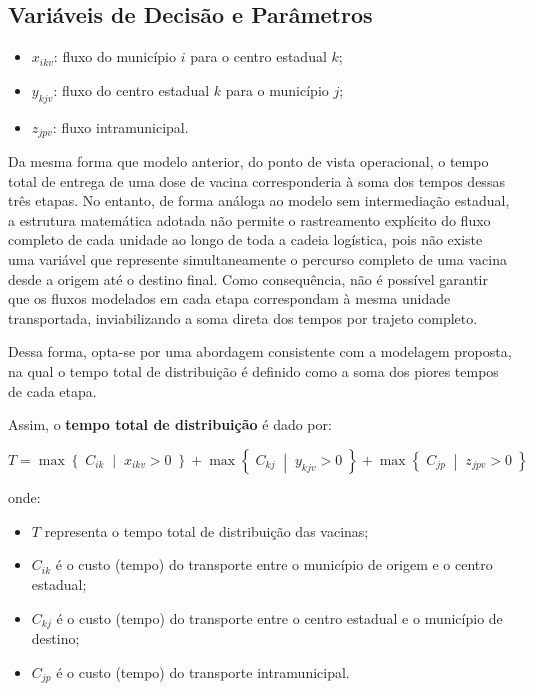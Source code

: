 \subsection{Variáveis de Decisão e Parâmetros}

\begin{itemize}
    \item $x_{ikv}$: fluxo do município $i$ para o centro estadual $k$;
    \item $y_{kjv}$: fluxo do centro estadual $k$ para o município $j$;
    \item $z_{jpv}$: fluxo intramunicipal.
\end{itemize}

Da mesma forma que modelo anterior, do ponto de vista operacional, o tempo total de entrega de uma dose de vacina corresponderia à soma dos tempos dessas três etapas. No entanto, de forma análoga ao modelo sem intermediação estadual, a estrutura matemática adotada não permite o rastreamento explícito do fluxo completo de cada unidade ao longo de toda a cadeia logística, pois não existe uma variável que represente simultaneamente o percurso completo de uma vacina desde a origem até o destino final. Como consequência, não é possível garantir que os fluxos modelados em cada etapa correspondam à mesma unidade transportada, inviabilizando a soma direta dos tempos por trajeto completo.

Dessa forma, opta-se por uma abordagem consistente com a modelagem proposta, na qual o tempo total de distribuição é definido como a soma dos piores tempos de cada etapa.

Assim, o \textbf{tempo total de distribuição} é dado por:

\[
T = \max \left\{ \; C_{ik} \;\middle|\; x_{ikv} > 0 \; \right\} + 
\max \left\{ \; C_{kj} \;\middle|\; y_{kjv} > 0 \; \right\} + 
\max \left\{ \; C_{jp} \;\middle|\; z_{jpv} > 0 \; \right\}
\]

onde:
\begin{itemize}
    \item $T$ representa o tempo total de distribuição das vacinas;
    \item $C_{ik}$ é o custo (tempo) do transporte entre o município de origem e o centro estadual;
    \item $C_{kj}$ é o custo (tempo) do transporte entre o centro estadual e o município de destino;
    \item $C_{jp}$ é o custo (tempo) do transporte intramunicipal.
\end{itemize}

